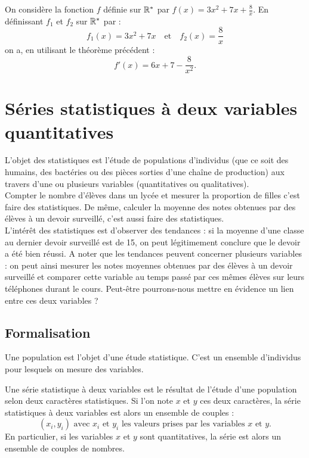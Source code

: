 \documentclass[a4paper, 12pt]{report}
\begin{document}
\begin{ex}
On considère la fonction $f$ définie sur $\mathbb{R}^{\ast}$ par $f(x) = 3x^2 + 7x + \frac{8}{x}$. En définissant $f_1$ et $f_2$ sur $\mathbb{R}^{\ast}$ par :
\[ f_1(x) = 3x^2 + 7x  \quad \text{et} \quad f_2(x) = \frac{8}{x} \]
on a, en utilisant le théorème précédent :
\[ f'(x) = 6x + 7 - \frac{8}{x^2} . \]
\end{ex}

\chapter{Séries statistiques à deux variables quantitatives}

L'objet des statistiques est l'étude de populations d'individus (que ce soit des humains, des bactéries ou des pièces sorties d'une chaîne
de production) aux travers d'une ou plusieurs variables (quantitatives ou qualitatives). \\
Compter le nombre d'élèves dans un lycée et mesurer la proportion de filles c'est faire des statistiques. 
De même, calculer la moyenne des notes obtenues par des élèves à un devoir surveillé, c'est aussi faire des statistiques. \\
L'intérêt des statistiques est d'observer des tendances : si la moyenne d'une classe au dernier devoir surveillé est de 15, on peut 
légitimement conclure que le devoir a été bien réussi. A noter que les tendances peuvent concerner plusieurs variables : on peut ainsi
mesurer les notes moyennes obtenues par des élèves à un devoir surveillé et comparer cette variable au temps passé par ces mêmes
élèves sur leurs téléphones durant le cours. Peut-être pourrons-nous mettre en évidence un lien entre ces deux variables ? 


\section{Formalisation}

\begin{nomen}
Une population est l'objet d'une étude statistique. C'est un ensemble d'individus pour lesquels on mesure des variables.
\end{nomen}

\begin{defn}
Une série statistique à deux variables est le résultat de l'étude d'une population selon deux caractères statistiques.
Si l'on note $x$ et $y$ ces deux caractères, la série statistiques à deux variables est alors un ensemble de couples :
\[ (x_i, y_i) \text{ avec $x_i$ et $y_i$ les valeurs prises par les variables $x$ et $y$} . \]
En particulier, si les variables $x$ et $y$ sont quantitatives, la série est alors un ensemble de couples de nombres.
\end{defn}
\end{document}
